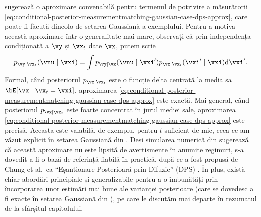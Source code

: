 \documentclass[../../book-main_ro.tex]{subfiles}
\begin{document}
 sugerează o aproximare convenabilă
pentru termenul de potrivire a măsurătorii
\eqref{eq:conditional-posterior-measurementmatching-gaussian-case-dps-approx},
care poate fi făcută dincolo de setarea Gaussiană a exemplului. Pentru a
motiva această aproximare într-o generalitate mai mare, observați că
prin independența condiționată a $\vy$ și $\vx_t$ date $\vx$, putem scrie
\begin{equation}
  p_{\vy \mid \vx_t}(\vnu \mid \vxi)
  =
  \int p_{\vy \mid \vx}(\vnu \mid \vxi') p_{\vx \mid \vx_t}(\vxi' \mid \vxi)
  \odif  \vxi'.
\end{equation}
Formal, când posteriorul $p_{\vx\mid \vx_t}$ este o funcție delta centrată la
media sa $\bE[\vx \mid \vx_t=\vxi]$, aproximarea
\eqref{eq:conditional-posterior-measurementmatching-gaussian-case-dps-approx} este
exactă. Mai general, când posteriorul $p_{\vx \mid \vx_t}$ este foarte
concentrat în jurul mediei sale, aproximarea
\eqref{eq:conditional-posterior-measurementmatching-gaussian-case-dps-approx} este
precisă. Aceasta este valabilă, de exemplu, pentru $t$ suficient de mic, ceea ce am văzut
explicit în setarea Gaussiană din
.
Deși simularea numerică din
 sugerează că această
aproximare nu este lipsită de avertismente în anumite regimuri, s-a dovedit a fi
o bază de referință fiabilă în practică, după ce a fost propusă de Chung et al.\ ca
``Eșantionare Posterioară prin Difuzie'' (DPS) \cite{chung2023diffusion}.
În plus, există chiar abordări principiale și generalizabile pentru a o îmbunătăți prin
încorporarea unor estimări mai bune ale varianței posterioare (care se dovedesc a fi
exacte în setarea Gaussiană din ),
pe care le discutăm mai departe în rezumatul de la sfârșitul capitolului.
\end{document}
